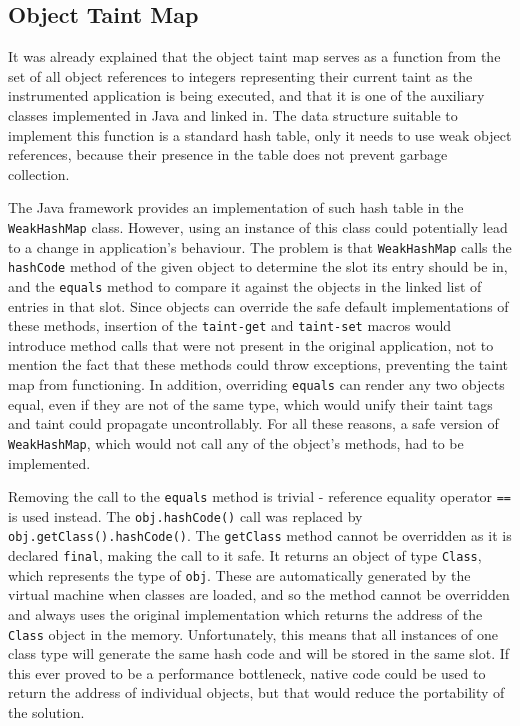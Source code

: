 \documentclass[12pt,twoside,notitlepage]{report}
\begin{document}
\label{section:Code_MethodEntering}

\subsection{Object Taint Map}

It was already explained that the object taint map serves as a function from the set of all object references to integers representing their current taint as the instrumented application is being executed, and that it is one of the auxiliary classes implemented in Java and linked in. The data structure suitable to implement this function is a standard hash table, only it needs to use weak object references, because their presence in the table does not prevent garbage collection.

The Java framework provides an implementation of such hash table in the \verb$WeakHashMap$ class. However, using an instance of this class could potentially lead to a change in application's behaviour. The problem is that \verb$WeakHashMap$ calls the \verb$hashCode$ method of the given object to determine the slot its entry should be in, and the \verb$equals$ method to compare it against the objects in the linked list of entries in that slot. Since objects can override the safe default implementations of these methods, insertion of the \verb$taint-get$ and \verb$taint-set$ macros would introduce method calls that were not present in the original application, not to mention the fact that these methods could throw exceptions, preventing the taint map from functioning. In addition, overriding \verb$equals$ can render any two objects equal, even if they are not of the same type, which would unify their taint tags and taint could propagate uncontrollably. For all these reasons, a safe version of \verb$WeakHashMap$, which would not call any of the object's methods, had to be implemented. 

Removing the call to the \verb$equals$ method is trivial - reference equality operator \verb$==$ is used instead. The \verb$obj.hashCode()$ call was replaced by \verb$obj.getClass().hashCode()$. The \verb$getClass$ method cannot be overridden as it is declared \verb$final$, making the call to it safe. It returns an object of type \verb$Class$, which represents the type of \verb$obj$. These are automatically generated by the virtual machine when classes are loaded, and so the method cannot be overridden and always uses the original implementation which returns the address of the \verb$Class$ object in the memory. Unfortunately, this means that all instances of one class type will generate the same hash code and will be stored in the same slot. If this ever proved to be a performance bottleneck, native code could be used to return the address of individual objects, but that would reduce the portability of the solution. 
\end{document}
